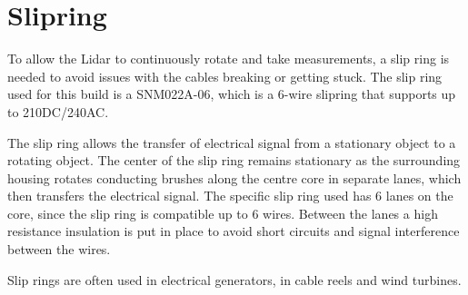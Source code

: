 \clearpage
\section{Slipring}

To allow the Lidar to continuously rotate and take measurements, a slip ring is needed to avoid issues with the cables breaking or getting stuck. 
The slip ring used for this build is a SNM022A-06\cite{slipring}, which is a 6-wire slipring that supports up to 210DC/240AC. 

The slip ring allows the transfer of electrical signal from a stationary object to a rotating object. The center of the slip ring remains stationary as the surrounding housing rotates conducting brushes along the centre core in separate lanes, which then transfers the electrical signal.
The specific slip ring used has 6 lanes on the core, since the slip ring is compatible up to 6 wires. Between the lanes a high resistance insulation is put in place to avoid short circuits and signal interference between the wires. 

Slip rings are often used in electrical generators, in cable reels and wind turbines. 


